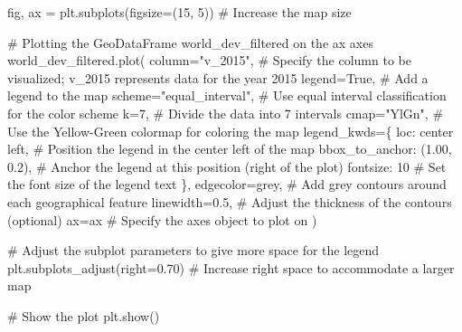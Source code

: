 \documentclass[
  letterpaper,
  DIV=11,
  numbers=noendperiod]{scrreprt}
\newenvironment{Shaded}{\begin{snugshade}}{\end{snugshade}}
\newcommand{\CommentTok}[1]{\textcolor[rgb]{0.37,0.37,0.37}{#1}}
\newcommand{\DecValTok}[1]{\textcolor[rgb]{0.68,0.00,0.00}{#1}}
\newcommand{\FloatTok}[1]{\textcolor[rgb]{0.68,0.00,0.00}{#1}}
\newcommand{\NormalTok}[1]{\textcolor[rgb]{0.00,0.23,0.31}{#1}}
\newcommand{\OperatorTok}[1]{\textcolor[rgb]{0.37,0.37,0.37}{#1}}
\newcommand{\StringTok}[1]{\textcolor[rgb]{0.13,0.47,0.30}{#1}}
\newcommand{\VariableTok}[1]{\textcolor[rgb]{0.07,0.07,0.07}{#1}}
\begin{document}
\begin{Shaded}
\begin{Highlighting}[]
\NormalTok{fig, ax }\OperatorTok{=}\NormalTok{ plt.subplots(figsize}\OperatorTok{=}\NormalTok{(}\DecValTok{15}\NormalTok{, }\DecValTok{5}\NormalTok{))  }\CommentTok{\# Increase the map size}

\CommentTok{\# Plotting the GeoDataFrame \textasciigrave{}world\_dev\_filtered\textasciigrave{} on the \textasciigrave{}ax\textasciigrave{} axes}
\NormalTok{world\_dev\_filtered.plot(}
\NormalTok{    column}\OperatorTok{=}\StringTok{"v\_2015"}\NormalTok{,  }\CommentTok{\# Specify the column to be visualized; \textasciigrave{}v\_2015\textasciigrave{} represents data for the year 2015}
\NormalTok{    legend}\OperatorTok{=}\VariableTok{True}\NormalTok{,  }\CommentTok{\# Add a legend to the map}
\NormalTok{    scheme}\OperatorTok{=}\StringTok{"equal\_interval"}\NormalTok{,  }\CommentTok{\# Use equal interval classification for the color scheme}
\NormalTok{    k}\OperatorTok{=}\DecValTok{7}\NormalTok{,  }\CommentTok{\# Divide the data into 7 intervals}
\NormalTok{    cmap}\OperatorTok{=}\StringTok{"YlGn"}\NormalTok{,  }\CommentTok{\# Use the Yellow{-}Green colormap for coloring the map}
\NormalTok{    legend\_kwds}\OperatorTok{=}\NormalTok{\{}
        \StringTok{\textquotesingle{}loc\textquotesingle{}}\NormalTok{: }\StringTok{\textquotesingle{}center left\textquotesingle{}}\NormalTok{,  }\CommentTok{\# Position the legend in the center left of the map}
        \StringTok{\textquotesingle{}bbox\_to\_anchor\textquotesingle{}}\NormalTok{: (}\FloatTok{1.00}\NormalTok{, }\FloatTok{0.2}\NormalTok{),  }\CommentTok{\# Anchor the legend at this position (right of the plot)}
        \StringTok{\textquotesingle{}fontsize\textquotesingle{}}\NormalTok{: }\DecValTok{10}  \CommentTok{\# Set the font size of the legend text}
\NormalTok{    \},}
\NormalTok{    edgecolor}\OperatorTok{=}\StringTok{\textquotesingle{}grey\textquotesingle{}}\NormalTok{,  }\CommentTok{\# Add grey contours around each geographical feature}
\NormalTok{    linewidth}\OperatorTok{=}\FloatTok{0.5}\NormalTok{,  }\CommentTok{\# Adjust the thickness of the contours (optional)}
\NormalTok{    ax}\OperatorTok{=}\NormalTok{ax  }\CommentTok{\# Specify the axes object to plot on}
\NormalTok{)}

\CommentTok{\# Adjust the subplot parameters to give more space for the legend}
\NormalTok{plt.subplots\_adjust(right}\OperatorTok{=}\FloatTok{0.70}\NormalTok{)  }\CommentTok{\# Increase right space to accommodate a larger map}

\CommentTok{\# Show the plot}
\NormalTok{plt.show()}
\end{Highlighting}
\end{Shaded}
\end{document}
